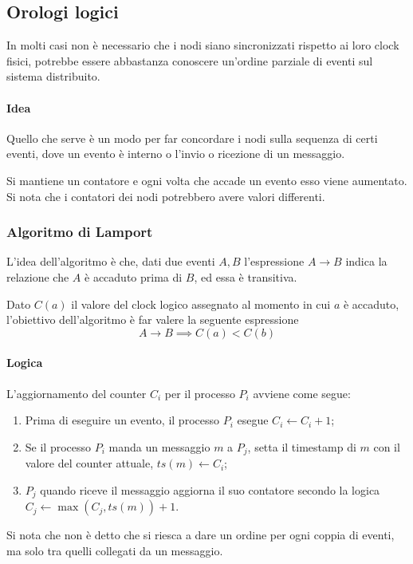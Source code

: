 \subsection{Orologi logici}

In molti casi non è necessario che i nodi siano sincronizzati 
rispetto ai loro clock fisici, potrebbe essere abbastanza 
conoscere un'ordine parziale di eventi sul sistema distribuito.

\paragraph{Idea}
Quello che serve è un modo per far concordare i nodi sulla
sequenza di certi eventi, dove un evento 
è interno o l'invio o ricezione di un messaggio. 

Si mantiene un contatore e ogni volta che accade un evento 
esso viene aumentato. Si nota che i contatori 
dei nodi potrebbero avere valori differenti.

\subsubsection{Algoritmo di Lamport}

L'idea dell'algoritmo è che, dati due eventi 
$A, B$ l'espressione $A \rightarrow B$ indica la relazione 
che $A$ è accaduto prima di $B$, ed essa è transitiva.

Dato $C(a)$ il valore del clock logico assegnato 
al momento in cui $a$ è accaduto, l'obiettivo dell'algoritmo 
è far valere la seguente espressione
$$A \rightarrow B \implies C(a) < C(b)$$

\paragraph{Logica}
L'aggiornamento del counter $C_i$ per il 
processo $P_i$ avviene come segue: 
\begin{enumerate}
    \item Prima di eseguire un evento, il processo $P_i$ 
    esegue $C_i \gets C_i + 1$;
    \item Se il processo $P_i$ manda un messaggio $m$ a $P_j$, 
    setta il timestamp di $m$ con il valore del counter attuale, 
    $ts(m) \gets C_i$;
    \item $P_j$ quando riceve il messaggio aggiorna il suo 
    contatore secondo la logica $C_j \gets \max(C_j, ts(m)) + 1$.
\end{enumerate}
Si nota che non è detto che si riesca a dare un ordine per ogni 
coppia di eventi, ma solo tra quelli collegati da un messaggio.

